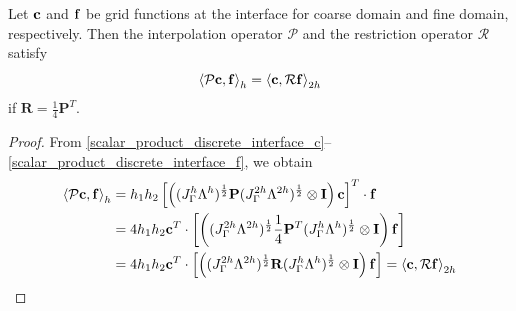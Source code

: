  \begin{lemma}\label{lemma1}
 	Let ${\bf c}$ and ${\bf f}$ be grid functions at the interface for coarse domain and fine domain, respectively. Then the interpolation operator $\mathcal{P}$ and the restriction operator $\mathcal{R}$ satisfy
 	\begin{equation}\label{pr_relation}
 	\left<\mathcal{P} {\bf c}, {\bf f}\right>_h = \left<{\bf c}, \mathcal{R}{\bf f}\right>_{2h}
 	\end{equation}
 	if $\bm{R} = \frac{1}{4}\bm{P}^T$. 
 \end{lemma}
 \begin{proof}
 	From \eqref{scalar_product_discrete_interface_c}--\eqref{scalar_product_discrete_interface_f}, we obtain
 	\begin{align*}
 	\left<\mathcal{P}{\bf c}, {\bf f}\right>_h &= h_1h_2\left[\left((J_{\Gamma}^h\Lambda^h)^{\frac{1}{2}} {\bf P}(J_{\Gamma}^{2h}\Lambda^{2h})^{\frac{1}{2}}\otimes {\bf I}\right){\bf c}\right]^T\cdot{\bf f}\\
 	& = 4h_1h_2 {\bf c}^T \cdot \left[\left((J_{\Gamma}^{2h}\Lambda^{2h})^{\frac{1}{2}}\frac{1}{4}{\bf P}^T(J_{\Gamma}^h\Lambda^h)^{\frac{1}{2}}\otimes {\bf I}\right) {\bf f}\right]\\
 	& =4h_1h_2 {\bf c}^T \cdot \left[\left((J_{\Gamma}^{2h}\Lambda^{2h})^{\frac{1}{2}}{\bf R}(J_{\Gamma}^h\Lambda^h)^{\frac{1}{2}}\otimes {\bf I}\right) {\bf f}\right] = \left<{\bf c}, \mathcal{R}{\bf f}\right>_{2h}
 	\end{align*}
 \end{proof}
 


